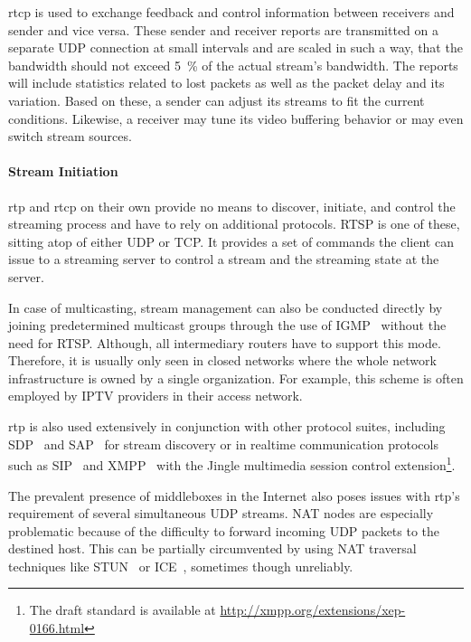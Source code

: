\gls{rtcp} is used to exchange feedback and control information between receivers and sender and vice versa. These sender and receiver reports are transmitted on a separate \gls{UDP} connection at small intervals and are scaled in such a way, that the bandwidth should not exceed \SI{5}{\percent} of the actual stream's bandwidth. The reports will include statistics related to lost packets as well as the packet delay and its variation. Based on these, a sender can adjust its streams to fit the current conditions. Likewise, a receiver may tune its video buffering behavior or may even switch stream sources.


\paragraph{Stream Initiation}

\gls{rtp} and \gls{rtcp} on their own provide no means to discover, initiate, and control the streaming process and have to rely on additional protocols. \gls{RTSP} is one of these, sitting atop of either \gls{UDP} or \gls{TCP}. It provides a set of commands the client can issue to a streaming server to control a stream and the streaming state at the server.

In case of multicasting, stream management can also be conducted directly by joining predetermined multicast groups through the use of \gls{IGMP}~\cite{rfc4604} without the need for \gls{RTSP}. Although, all intermediary routers have to support this mode. Therefore, it is usually only seen in closed networks  where the whole network infrastructure is owned by a single organization. For example, this scheme is often employed by \gls{IPTV} providers in their access network.


\gls{rtp} is also used extensively in conjunction with other protocol suites, including \gls{SDP}~\cite{rfc2327} and \gls{SAP}~\cite{rfc2974} for stream discovery or in realtime communication protocols such as \gls{SIP}~\cite{rfc3261} and \gls{XMPP}~\cite{rfc6120,rfc6121} with the Jingle multimedia session control extension\footnote{The draft standard is available at \url{http://xmpp.org/extensions/xep-0166.html}}.

The prevalent presence of middleboxes in the Internet also poses issues with \Gls{rtp}'s requirement of several simultaneous \gls{UDP} streams. \gls{NAT} nodes are especially problematic because of the difficulty to forward incoming \gls{UDP} packets to the destined host. This can be partially circumvented by using \gls{NAT} traversal techniques like \gls{STUN}~\cite{rfc5389} or \gls{ICE}~\cite{rfc5245}, sometimes though unreliably.


